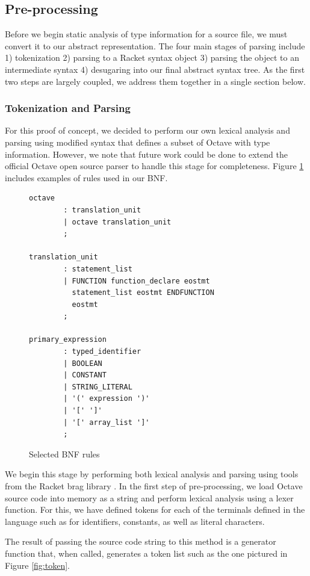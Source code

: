 \subsection{Pre-processing}
Before we begin static analysis of type information for a source file, we must convert it to our abstract representation. The four main stages of parsing include 1) tokenization 2) parsing to a Racket syntax object 3) parsing the object to an intermediate syntax 4) desugaring into our final abstract syntax tree. As the first two steps are largely coupled, we address them together in a single section below.

\subsubsection{Tokenization and Parsing}
For this proof of concept, we decided to perform our own lexical analysis and parsing using modified syntax that defines a subset of Octave with type information. However, we note that future work could be done to extend the official Octave open source parser \cite{johneaton2018octaveparser} to handle this stage for completeness. Figure \ref{fig:bnf} includes examples of rules used in our BNF.

\begin{figure}[h]
    \begin{lstlisting}
octave
        : translation_unit
        | octave translation_unit
        ;

translation_unit
        : statement_list
        | FUNCTION function_declare eostmt
          statement_list eostmt ENDFUNCTION
          eostmt
        ;

primary_expression
        : typed_identifier
        | BOOLEAN
        | CONSTANT
        | STRING_LITERAL
        | '(' expression ')'
        | '[' ']'
        | '[' array_list ']'
        ;
    \end{lstlisting}
    \caption[]{Selected BNF rules}
    \label{fig:bnf}
\end{figure}

We begin this stage by performing both lexical analysis and parsing using tools from the Racket brag library \cite{bragdocs}. In the first step of pre-processing, we load Octave source code into memory as a string and perform lexical analysis using a lexer function. For this, we have defined tokens for each of the terminals defined in the language such as for identifiers, constants, as well as literal characters.

The result of passing the source code string to this method is a generator function that, when called, generates a token list such as the one pictured in Figure \ref{fig:token}.

